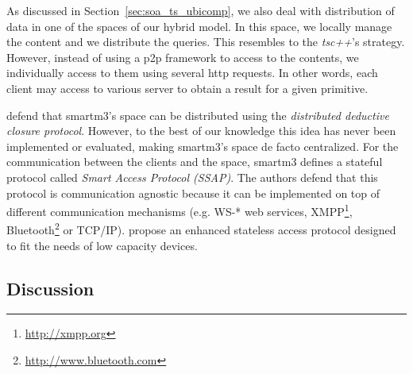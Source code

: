 As discussed in Section~\ref{sec:soa_ts_ubicomp}, we also deal with distribution of data in one of the spaces of our hybrid model.
In this space, we locally manage the content and we distribute the queries.
This resembles to the \emph{tsc++}'s strategy.
However, instead of using a \ac{p2p} framework to access to the contents,
we individually access to them using several \ac{http} requests. %
In other words, each client may access to various server to obtain a result for a given primitive.

\citet{honkola_smart-m3_2010} defend that \acs{smartm3}'s space can be distributed using the \emph{distributed deductive closure protocol}.
However, to the best of our knowledge this idea has never been implemented or evaluated, making \acs{smartm3}'s space de facto centralized.
For the communication between the clients and the space, \acs{smartm3} defines a stateful protocol called \emph{Smart Access Protocol (SSAP)}. %
The authors defend that this protocol is communication agnostic because it can be implemented on top of different communication mechanisms
(e.g. WS-* web services, XMPP\footnote{\url{http://xmpp.org}}, Bluetooth\footnote{\url{http://www.bluetooth.com}} or TCP/IP).
\citet{kiljander_knowledge_2012} propose an enhanced stateless access protocol designed to fit the needs of low capacity devices.





\subsection{Discussion}
\label{sec:soa_tsc_discussion}

